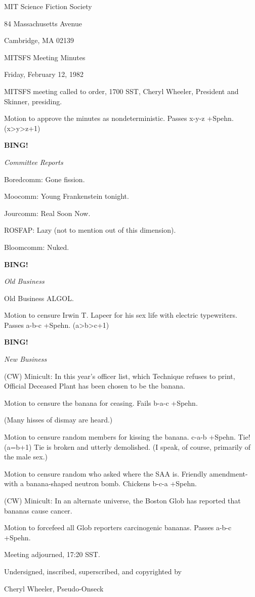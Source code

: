 \documentclass[12pt]{article}
\newcommand{\bing}{{\bf BING!} }
\newcommand{\goto}[1]{\bing \vskip 12pt \centerline{{\em{#1}}}}
\begin{document}
\begin{center}

MIT Science Fiction Society 

84 Massachusetts Avenue

Cambridge, MA 02139

\vspace{12pt}

MITSFS Meeting Minutes 

Friday, February 12, 1982

\end{center}
 
\vspace{18pt}

\setlength{\parskip}{6pt}

\noindent
MITSFS meeting called to order, 1700 SST,
Cheryl Wheeler, President and Skinner, presiding.

Motion to approve the minutes as nondeterministic. Passes x-y-z +Spehn. (x>y>z+1)

\goto{Committee Reports}

Boredcomm: Gone fission.

Moocomm: Young Frankenstein tonight.

Jourcomm: Real Soon Now.

ROSFAP: Lazy (not to mention out of this dimension).

Bloomcomm: Nuked.

\goto{Old Business}

Old Business ALGOL.

Motion to censure Irwin T. Lapeer for his sex life with electric typewriters. Passes a-b-c +Spehn. (a>b>c+1)

\goto{New Business}

(CW) Minicult: In this year's officer list, which Technique refuses to print, Official Deceased Plant has been chosen to be the banana.

Motion to censure the banana for ceasing. Fails b-a-c +Spehn.

(Many hisses of dismay are heard.)

Motion to censure random members for kissing the banana. c-a-b +Spehn. Tie! (a=b+1) Tie is broken and utterly demolished. (I speak, of course, primarily of the male sex.)

Motion to censure random who asked where the SAA is. Friendly amendment- with a banana-shaped neutron bomb. Chickens b-c-a +Spehn.

(CW) Minicult: In an alternate universe, the Boston Glob has reported that bananas cause cancer.

Motion to forcefeed all Glob reporters carcinogenic bananas. Passes a-b-c +Spehn.

\vspace{12pt}

\noindent
Meeting adjourned, 17:20 SST.

\vspace{18pt}

\centerline{Undersigned, inscribed, superscribed, and copyrighted by}
\centerline{Cheryl Wheeler, Pseudo-Onseck}
\end{document}

